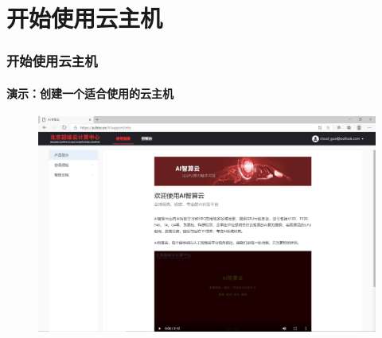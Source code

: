 \documentclass[10pt]{beamer}
\begin{document}
    \section{开始使用云主机}
        \begin{frame}
            \frametitle{开始使用云主机}
                \framesubtitle{演示：创建一个适合使用的云主机}

                \centering
                \begin{figure}
                    \href{https://ai.blsc.cn/\#/support/info}{
                        \includegraphics[width=\textwidth]{src/img/Welcome.png}
                        }
                \end{figure}

        \end{frame}
\end{document}
